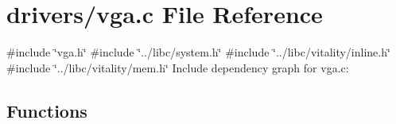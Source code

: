 \hypertarget{a00032}{}\section{drivers/vga.c File Reference}
\label{a00032}
{\ttfamily \#include \char`\"{}vga.\+h\char`\"{}}\newline
{\ttfamily \#include \char`\"{}../libc/system.\+h\char`\"{}}\newline
{\ttfamily \#include \char`\"{}../libc/vitality/inline.\+h\char`\"{}}\newline
{\ttfamily \#include \char`\"{}../libc/vitality/mem.\+h\char`\"{}}\newline
Include dependency graph for vga.\+c\+:
\subsection*{Functions}
